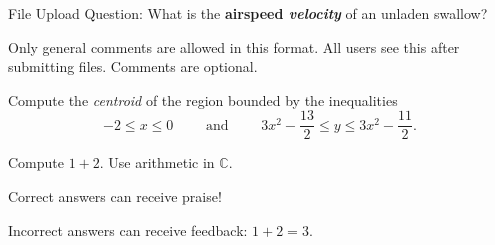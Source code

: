 \documentclass{article}
\begin{document}
\begin{questionbank}  %

\begin{question}
File Upload Question: What is the \textbf{airspeed \textit{velocity}} of an unladen swallow?  %
\begin{comments}
Only general comments are allowed in this format. All users see this after submitting files. Comments are optional.
\end{comments}
\end{question}

\begin{question}
Compute the {\it centroid} of the region bounded by the inequalities $$-2 \leq x \leq 0 \qquad \mbox{ and } \qquad {3x^2-\frac{13}{2}} \leq y \leq {3x^2-\frac{11}{2}}.$$
\begin{multiplechoice}
 \choicebreak %
\end{multiplechoice}
\end{question}

\begin{question}
Compute $1 + 2$. Use arithmetic in $\mathbb C$.
\begin{shortanswer} %
  
\end{shortanswer}
\begin{praise}
Correct answers can receive praise!
\end{praise}
\begin{feedback}
Incorrect answers can receive feedback: $1 + 2 = 3$.
\end{feedback}
\end{question}



\end{questionbank}
\end{document}
